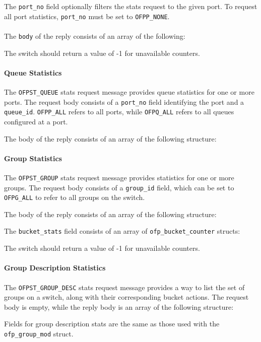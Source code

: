 
The \verb|port_no| field optionally filters the stats request to the given port.  To request all port statistics, \verb|port_no| must be set to \verb|OFPP_NONE|.
\\\\
The \verb|body| of the reply consists of an array of the following:


The switch should return a value of -1 for unavailable counters.

\paragraph{Queue Statistics}
The \verb|OFPST_QUEUE| stats request message provides
  queue statistics for one or more ports.
  The request body consists of a \verb|port_no| field
identifying the port and a \verb|queue_id|. \verb|OFPP_ALL|
refers to all ports, while \verb|OFPQ_ALL| refers to all queues configured
at a port.


The body of the reply consists of an array of
the following structure:


\paragraph{Group Statistics}
The \verb|OFPST_GROUP| stats request message provides statistics for one or more groups.  The request body consists of a \verb|group_id| field, which can be set to \verb|OFPG_ALL| to refer to all groups on the switch.


The body of the reply consists of an array of the following structure:


The \verb|bucket_stats| field consists of an array of \verb|ofp_bucket_counter| structs:


The switch should return a value of -1 for unavailable counters.
\paragraph{Group Description Statistics}
The \verb|OFPST_GROUP_DESC| stats request message provides a way to list the set of groups on a switch, along with their corresponding bucket actions.  The request body is empty, while the reply body is an array of the following structure:


Fields for group description stats are the same as those used with the \verb|ofp_group_mod| struct.

